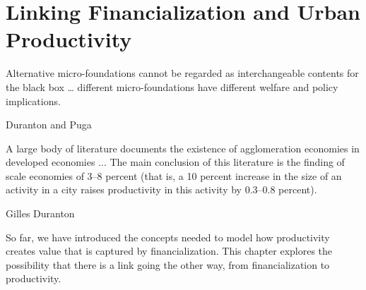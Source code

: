 \chapter{Linking Financialization and Urban Productivity} \label{chapter-tramsmission} %

\epigraph{Alternative micro-foundations cannot be regarded as interchangeable contents for the black box \dots %
different micro-foundations have different welfare and policy implications. %
}{Duranton and Puga \cite{durantonMicroFoundationsUrbanAgglomeration2004}}

\epigraph{A large body of literature documents the existence of agglomeration economies in developed economies ... The main conclusion of this literature is the finding of scale economies of 3--8 percent (that is, a 10 percent increase in the size of an activity in a city raises productivity in this activity by 0.3--0.8 percent).}{Gilles Duranton \cite{durantonAreCitiesEngines2009}} %

So far, we have introduced the concepts needed to model %
how productivity creates value that is captured by financialization. %
This chapter explores the possibility that there is a link going the other way, from financialization to productivity. 

